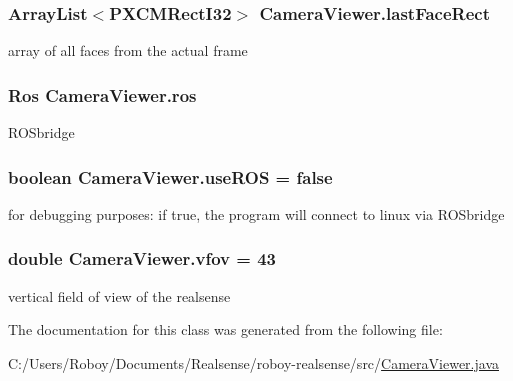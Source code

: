 \subsubsection[{\texorpdfstring{last\+Face\+Rect}{lastFaceRect}}]{\setlength{\rightskip}{0pt plus 5cm}Array\+List$<$P\+X\+C\+M\+Rect\+I32$>$ Camera\+Viewer.\+last\+Face\+Rect\hspace{0.3cm}{\ttfamily [static]}}\hypertarget{class_camera_viewer_a4bc05c51ad1bc21023c7a8b5faf2edc6}{}\label{class_camera_viewer_a4bc05c51ad1bc21023c7a8b5faf2edc6}
array of all faces from the actual frame 
\subsubsection[{\texorpdfstring{ros}{ros}}]{\setlength{\rightskip}{0pt plus 5cm}Ros Camera\+Viewer.\+ros\hspace{0.3cm}{\ttfamily [static]}}\hypertarget{class_camera_viewer_a03084cede72b21c8d4c3be7653f0ea9d}{}\label{class_camera_viewer_a03084cede72b21c8d4c3be7653f0ea9d}
R\+O\+Sbridge 
\subsubsection[{\texorpdfstring{use\+R\+OS}{useROS}}]{\setlength{\rightskip}{0pt plus 5cm}boolean Camera\+Viewer.\+use\+R\+OS = false\hspace{0.3cm}{\ttfamily [static]}}\hypertarget{class_camera_viewer_a5925c6ab3f43232f9c4e1a2e5c4b2623}{}\label{class_camera_viewer_a5925c6ab3f43232f9c4e1a2e5c4b2623}
for debugging purposes\+: if true, the program will connect to linux via R\+O\+Sbridge 
\subsubsection[{\texorpdfstring{vfov}{vfov}}]{\setlength{\rightskip}{0pt plus 5cm}double Camera\+Viewer.\+vfov = 43\hspace{0.3cm}{\ttfamily [static]}}\hypertarget{class_camera_viewer_a767dac9c7706ba964760627c663196be}{}\label{class_camera_viewer_a767dac9c7706ba964760627c663196be}
vertical field of view of the realsense 

The documentation for this class was generated from the following file\+:\begin{DoxyCompactItemize}
\item 
C\+:/\+Users/\+Roboy/\+Documents/\+Realsense/roboy-\/realsense/src/\hyperlink{_camera_viewer_8java}{Camera\+Viewer.\+java}\end{DoxyCompactItemize}
